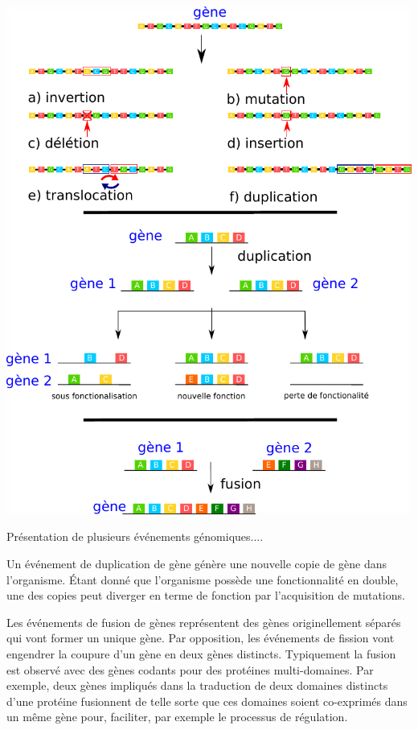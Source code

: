 \begin{refsegment}
    \begin{shadedfigure}[H]
        \centering
        \includegraphics[width=\textwidth]{img/gene_indel.pdf}
        \caption{Présentation de plusieurs événements génomiques....}
        \label{fig:/evenement_mutation}
    \end{shadedfigure}
    
    
    Un événement de duplication de gène génère une nouvelle copie de gène dans l’organisme. Étant donné que l'organisme possède une fonctionnalité en double, une des copies peut diverger en terme de fonction par l’acquisition de mutations. 
    
    Les événements de fusion de gènes représentent des gènes originellement séparés qui vont former un unique gène. Par opposition, les événements de fission vont  engendrer la coupure d’un gène en deux gènes distincts. Typiquement la fusion est observé avec des gènes codants pour des protéines multi-domaines. Par exemple, deux gènes impliqués dans la traduction de deux domaines distincts d'une protéine fusionnent de telle sorte que ces domaines soient co-exprimés dans un même gène pour, faciliter, par exemple le processus de régulation.
    

\end{refsegment}
